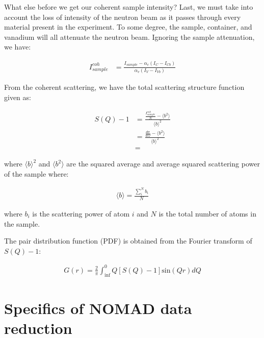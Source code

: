 What else before we get our coherent sample intensity? Last, we must take into account the loss of intensity of the neutron beam as it passes through every material present in the experiment. To some degree, the sample, container, and vanadium will all attenuate the neutron beam. Ignoring the sample attenuation, we have: 

\begin{equation} \label{eq_reduction}
\begin{split}
I_{sample}^{coh} & = \frac{I_{sample}-\alpha_c (I_{C}-I_{Cb})}{\alpha_v(I_{V}-I_{Vb})}  
\end{split}
\end{equation}

From the coherent scattering, we have the total scattering structure function given as:

\begin{equation} \label{eq_reduction}
\begin{split}
S(Q) - 1 & = \frac {\frac{I_{sample}^{coh}}{N} - \langle b^2 \rangle }{{{\langle b \rangle}^2 }} \\
         & = \frac {\frac{d \sigma}{d \Omega}  - \langle b^2 \rangle }{{{\langle b \rangle}^2 }} \\
         & = 
\end{split}
\end{equation}

where ${\langle b \rangle}^2$ and $\langle b^2 \rangle$ are the squared average and average squared scattering power of the sample where:

\begin{equation} \label{eq_reduction}
\begin{split}
\langle b \rangle = \frac {\sum_{i}^{N} b_{i}}{N}
\end{split}
\end{equation}


where $b_i$ is the scattering power of atom $i$ and $N$ is the total number of atoms in the sample.

The pair distribution function (PDF) is obtained from the Fourier transform of $S(Q)-1$:

\begin{equation} \label{eq_reduction}
\begin{split}
G(r) = \frac{2}{\pi} \int_{\inf}^{0} Q [S(Q)-1] \text{sin}(Qr) dQ
\end{split}
\end{equation}

\section{Specifics of NOMAD data reduction}

